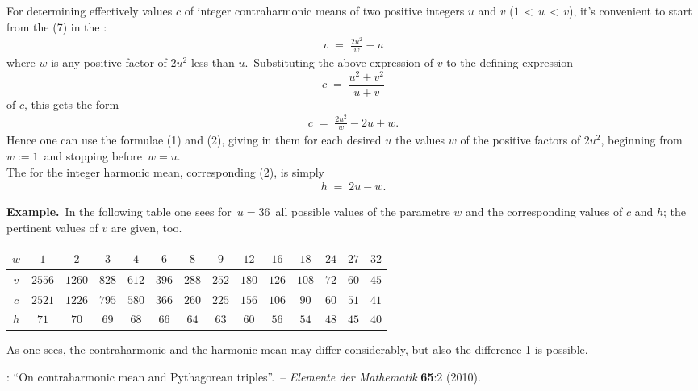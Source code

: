 \documentclass[12pt]{article}
\theoremstyle{definition}
\begin{document}
For determining effectively values $c$ of integer contraharmonic means of two positive integers $u$ and $v$ 
($1\,<\,u\,<\,v$), it's convenient to start from the 
 (7) in the 
:
\begin{align}
v \;=\; \frac{2u^2}{w}\!-\!u
\end{align}
where $w$ is any positive factor of $2u^2$ less than $u$.\, Substituting the above expression of $v$ to the defining expression 
$$c \;=\; \frac{u^2\!+\!v^2}{u\!+\!v}$$
of $c$, this gets the form
\begin{align}
c \;=\; \frac{2u^2}{w}\!-\!2u\!+\!w.
\end{align}
Hence one can use the formulae (1) and (2), giving in them for each desired $u$ the values $w$ of the positive factors of $2u^2$, beginning from\, $w := 1$\, and stopping before\, $w = u$.\\

The  for the integer harmonic mean, corresponding (2), is simply
\begin{align}
h \;=\; 2u\!-\!w.
\end{align}


\textbf{Example.}\, In the following table one sees for\, $u = 36$\, all possible values of the parametre $w$ and the corresponding
values of $c$ and $h$; the pertinent values of $v$ are given, too.
\begin{center}
\begin{tabular}{||c||c|c|c|c|c|c|c|c|c|c|c|c|c||}
\hline
$w$ & $1$ & $2$ & $3$ & $4$ & $6$ & $8$ & $9$ & $12$ & $16$
& $18$ & $24$ & $27$ & $32$\\
\hline
$v$ & $2556$ & $1260$ & $828$ & $612$ & $396$ & $288$ & $252$ & $180$ & $126$
& $108$ & $72$ & $60$ & $45$\\
\hline
$c$ & $2521$ & $1226$ & $795$ & $580$ & $366$ & $260$ & $225$ & $156$ & $106$
& $90$ & $60$ & $51$ & $41$\\
\hline
$h$ & $71$ & $70$ & $69$ & $68$ & $66$ & $64$ & $63$ & $60$ & $56$
& $54$ & $48$ & $45$ & $40$\\
\hline
\end{tabular}
\end{center}
As one sees, the contraharmonic and the harmonic mean may differ considerably, but also the difference 1 is possible.


\begin{thebibliography}{8}
: ``On contraharmonic mean and Pythagorean triples''.\, -- \emph{Elemente der Mathematik} \textbf{65}:2 (2010).
\end{thebibliography}

\end{document}
